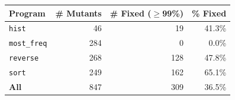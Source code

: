 \begin{tabular}{lrrr}
\toprule
Program & \# Mutants & \# Fixed ($\geq$99\%) & \% Fixed \\
\midrule
\texttt{hist} & 46 & 19 & 41.3\% \\
\texttt{most\_freq} & 284 & 0 & 0.0\% \\
\texttt{reverse} & 268 & 128 & 47.8\% \\
\texttt{sort} & 249 & 162 & 65.1\% \\
\midrule
\textbf{All} & 847 & 309 & 36.5\% \\
\bottomrule
\end{tabular}
